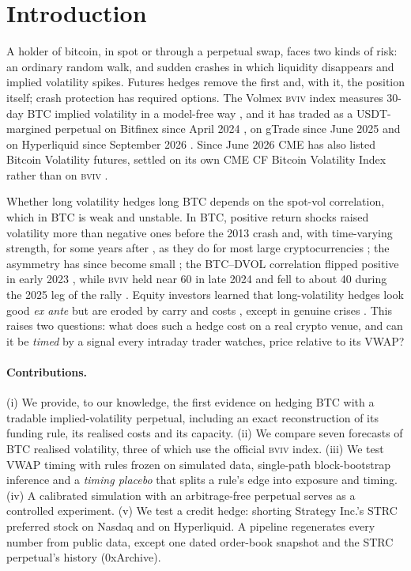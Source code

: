 \documentclass[10pt,a4paper]{article}
\newcommand{\BVIV}{\textsc{bviv}}
\begin{document}
\section{Introduction}\label{sec:intro}

A holder of bitcoin, in spot or through a perpetual swap, faces two kinds of risk: an ordinary random walk, and sudden crashes in which liquidity disappears and implied volatility spikes. Futures hedges remove the first and, with it, the position itself; crash protection has required options. The Volmex \BVIV{} index measures 30-day BTC implied volatility in a model-free way \citep{volmex2024iv}, and it has traded as a USDT-margined perpetual on Bitfinex since April 2024 \citep{coindesk2024bitfinex}, on gTrade since June 2025 \citep{coindesk2025gtrade} and on Hyperliquid since September 2026 \citep{coindesk2026hyperliquid}. Since June 2026 CME has also listed Bitcoin Volatility futures, settled on its own CME CF Bitcoin Volatility Index rather than on \BVIV{} \citep{cme2026bvi}.

Whether long volatility hedges long BTC depends on the spot-vol correlation, which in BTC is weak and unstable. In BTC, positive return shocks raised volatility more than negative ones before the 2013 crash \citep{bouri2017return} and, with time-varying strength, for some years after \citep{takaishi2021time}, as they do for most large cryptocurrencies \citep{baur2018asymmetric}; the asymmetry has since become small \citep{takaishi2021time}; the BTC--DVOL correlation flipped positive in early 2023 \citep{coindesk2023dvol}, while \BVIV{} held near 60 in late 2024 and fell to about 40 during the 2025 leg of the rally \citep{coindesk2025rally}. Equity investors learned that long-volatility hedges look good \emph{ex ante} but are eroded by carry and costs \citep{whaley2013trading,alexander2016diversification,israelov2019pathetic}, except in genuine crises \citep{szado2009vix}. This raises two questions: what does such a hedge cost on a real crypto venue, and can it be \emph{timed} by a signal every intraday trader watches, price relative to its VWAP?

\paragraph{Contributions.} (i) We provide, to our knowledge, the first evidence on hedging BTC with a tradable implied-volatility perpetual, including an exact reconstruction of its funding rule, its realised costs and its capacity. (ii) We compare seven forecasts of BTC realised volatility, three of which use the official \BVIV{} index. (iii) We test VWAP timing with rules frozen on simulated data, single-path block-bootstrap inference and a \emph{timing placebo} that splits a rule's edge into exposure and timing. (iv) A calibrated simulation with an arbitrage-free perpetual serves as a controlled experiment. (v) We test a credit hedge: shorting Strategy Inc.'s STRC preferred stock on Nasdaq and on Hyperliquid. A pipeline regenerates every number from public data, except one dated order-book snapshot and the STRC perpetual's history (0xArchive).
\end{document}

